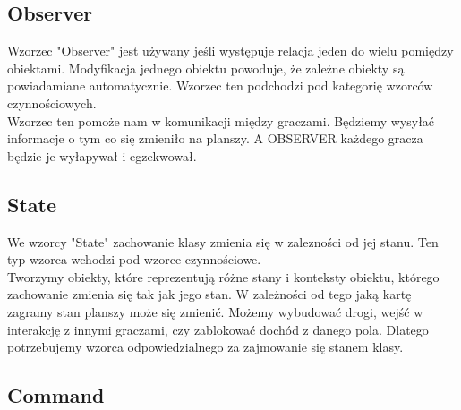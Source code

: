 \documentclass[a4paper, 11pt]{article}
\begin{document}
	\subsection{Observer}
	Wzorzec "Observer" jest używany jeśli występuje relacja jeden do wielu pomiędzy obiektami. Modyfikacja jednego obiektu powoduje, że zależne obiekty są powiadamiane automatycznie. Wzorzec ten podchodzi pod kategorię wzorców czynnościowych.\\
	Wzorzec ten pomoże nam w komunikacji między graczami. Będziemy wysyłać informacje o tym co się zmieniło na planszy. A OBSERVER każdego gracza będzie je wyłapywał i egzekwował.
	\subsection{State}
	\indent
	We wzorcy "State" zachowanie klasy zmienia się w zalezności od jej stanu. Ten typ wzorca wchodzi pod wzorce czynnościowe.\\
	Tworzymy obiekty, które reprezentują różne stany i konteksty obiektu, którego zachowanie zmienia się tak jak jego stan.
	W zależności od tego jaką kartę zagramy stan planszy może się zmienić. Możemy wybudować drogi, wejść w interakcję z innymi graczami, czy zablokować dochód z danego pola. Dlatego potrzebujemy wzorca odpowiedzialnego za zajmowanie się stanem klasy.
	\subsection{Command}
	
\end{document}
